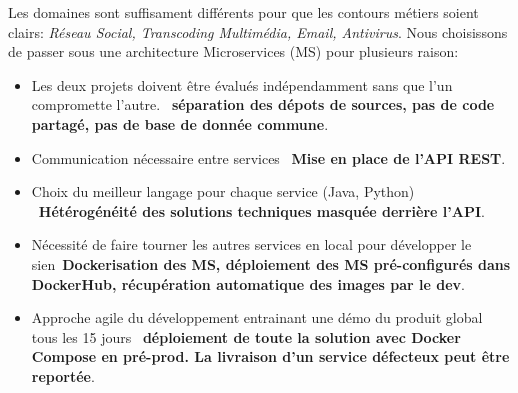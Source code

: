\documentclass[portrait,final,a0paper]{baposter}
\begin{document}
\begin{poster}
{\begin{multicols}{2}
	
	Les domaines sont suffisament différents pour que les contours métiers soient clairs: \textit{Réseau Social, Transcoding Multimédia, Email, Antivirus}. Nous choisissons de passer sous une architecture Microservices (MS) pour plusieurs raison:
	\vspace{1em}
	\begin{itemize}
		\item Les deux projets doivent être évalués indépendamment sans que l'un compromette l'autre. \MVRightarrow \  \textbf{séparation des dépots de sources, pas de code partagé, pas de base de donnée commune}.
		\item Communication nécessaire entre services \MVRightarrow \ \textbf{Mise en place de l'API REST}.
		\item Choix du meilleur langage pour chaque service (Java, Python) \MVRightarrow \ \textbf{Hétérogénéité des solutions techniques masquée derrière l'API}.
		\item Nécessité de faire tourner les autres services en local pour développer le sien\MVRightarrow \ \textbf{Dockerisation des MS, déploiement des MS pré-configurés dans DockerHub, récupération automatique des images par le dev}.
		\item Approche agile du développement entrainant une démo du produit global tous les 15 jours \MVRightarrow \ \textbf{déploiement de toute la solution avec Docker Compose en pré-prod. La livraison d'un service défecteux peut être reportée}.
		
	\end{itemize} 
	
					
	\end{multicols}
	
   \vspace{1.8em}
 }
 
\end{poster}
\end{document}
